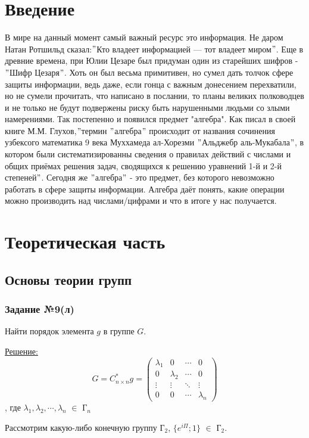 \documentclass[utf8,14pt,a4paper,oneside,russian]{book}
\begin{document}
	\section{Введение}
	В мире на данный момент самый важный ресурс это информация. Не даром Натан Ротшильд сказал:$"$Кто владеет информацией — тот владеет миром$"$. Еще в древние времена, при Юлии Цезаре был придуман один из старейших шифров - $"$Шифр Цезаря$"$. Хоть он был весьма примитивен, но сумел дать толчок сфере защиты информации, ведь даже, если гонца с важным донесением перехватили, но не сумели прочитать, что написано в послании, то планы великих полководцев и не только не будут подвержены риску быть нарушенными людьми со злыми намерениями. Так постепенно и появился предмет "алгебра". Как писал в своей книге М.М. Глухов,$"$термин $"$алгебра$"$ происходит от названия сочинения узбексого математика 9 века Муххамеда ал-Хорезми $"$Альджебр аль-Мукабала$"$, в котором были систематизированны  сведения о правилах действий с числами и общих приёмах решения задач, сводящихся к решению уравнений 1-й и 2-й степеней$"$. Сегодня же $"$алгебра$"$ - это предмет, без которого невозможно работать в сфере защиты информации. Алгебра даёт понять, какие операции можно производить над числами/цифрами и что в итоге у нас получается.
	\newpage
	\section{Теоретическая часть}
	\subsection{Основы теории групп}
	\subsubsection{Задание №9(л)}
	Найти порядок элемента $g$ в группе $G$.
	
	\underline{Решение:}\[ G = C^{*}_{n\times n}g = \left( 
	\begin{array}{cccc}
	\lambda_{1}&0&\cdots&0\\
	0&\lambda_{2}&\cdots&0\\
	\vdots&\vdots&\ddots&\vdots\\
	0&0&\cdots&\lambda_{n}
	\end{array} 
	\right) \]
	, где $\lambda_{1},\lambda_{2},\cdots,\lambda_{n}$ $\in$ Г$_{n}$
	
	Рассмотрим какую-либо конечную группу Г$_{2}$, $\{e^{i\Pi};1\}$ $\in$ Г$_{2}$.
	
\end{document}
